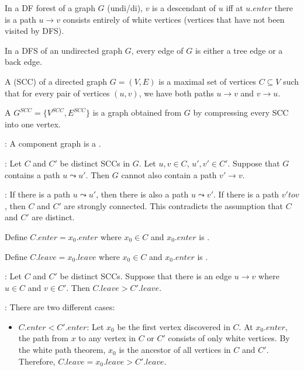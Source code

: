      \par In a DF forest of a graph $G$ (undi/di), $v$ is a descendant of $u$
        iff at $u.enter$ there is a path $u \to v$ consists entirely of white
        vertices (vertices that have not been visited by DFS).

      \par In a DFS of an undirected graph $G$, every edge of $G$ is either a
        tree edge or a back edge.


    \par A  (SCC) of a directed graph
      $G = (V, E)$ is a maximal set of vertices $C \subseteq V$ such that for
      every pair of vertices $(u, v)$, we have both paths $u \to v$ and $v \to u$.

    \par A  $G^{SCC} = \{ V^{SCC}, E^{SCC} \}$ is a graph
      obtained from $G$ by compressing every SCC into one vertex.
    \par {}: A component graph is a .
    \par {}: Let $C$ and $C'$ be distinct SCCs in $G$. Let $u, v \in C$,
      $u', v' \in C'$. Suppose that $G$ contains a path $u \leadsto u'$.
      Then $G$ cannot also contain a path $v' \to v$.
      \begin{smfont}
        \par {}: If there is a path $u \leadsto u'$, then there is also
          a path $u \leadsto v'$. If there is a path $v' to v$, then $C$ and
          $C'$ are strongly connected. This contradicts the assumption that $C$
          and $C'$ are distinct.
      \end{smfont}
    \par Define $C.enter = x_{0}.enter$ where $x_{0} \in C$ and $x_{0}.enter$
      is .
    \par Define $C.leave = x_{0}.leave$ where $x_{0} \in C$ and $x_{0}.enter$
      is .
    \par {}: Let $C$ and $C'$ be distinct SCCs. Suppose that there is
      an edge $u \to v$ where $u \in C$ and $v \in C'$. Then
      $C.leave > C'.leave$.
      \begin{smfont}
        \par {}: There are two different cases:
          \begin{itemize}
            \item $C.enter < C'.enter$: Let $x_{0}$ be the first vertex
              discovered in $C$. At $x_{0}.enter$, the path from $x$ to any
              vertex in $C$ or $C'$ consists of only white vertices. By the
              white path theorem, $x_{0}$ is the ancestor of all vertices in
              $C$ and $C'$. Therefore, $C.leave = x_{0}.leave > C'.leave$.
          \end{itemize}
      \end{smfont}


